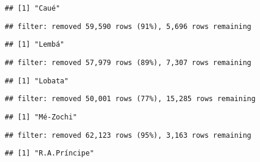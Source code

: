 \documentclass[
]{article}
\begin{document}
\begin{verbatim}
## [1] "Caué"
\end{verbatim}

\begin{verbatim}
## filter: removed 59,590 rows (91%), 5,696 rows remaining
\end{verbatim}

\begin{verbatim}
## [1] "Lembá"
\end{verbatim}

\begin{verbatim}
## filter: removed 57,979 rows (89%), 7,307 rows remaining
\end{verbatim}

\begin{verbatim}
## [1] "Lobata"
\end{verbatim}

\begin{verbatim}
## filter: removed 50,001 rows (77%), 15,285 rows remaining
\end{verbatim}

\begin{verbatim}
## [1] "Mé-Zochi"
\end{verbatim}

\begin{verbatim}
## filter: removed 62,123 rows (95%), 3,163 rows remaining
\end{verbatim}

\begin{verbatim}
## [1] "R.A.Príncipe"
\end{verbatim}
\end{document}
